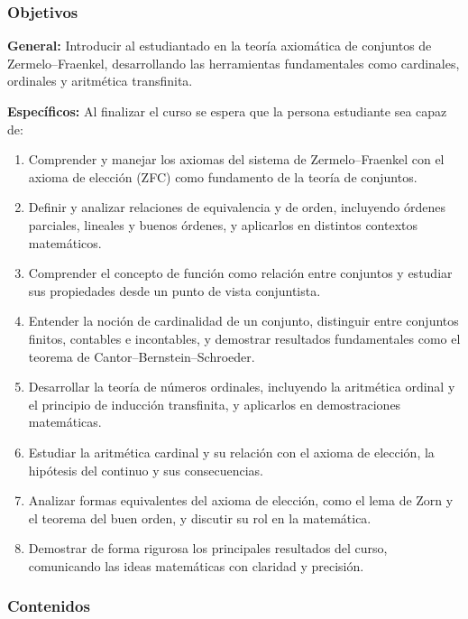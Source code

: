 \begin{refsection}
\subsubsection*{Objetivos}

\textbf{General:} Introducir al estudiantado en la teoría axiomática de conjuntos de Zermelo--Fraenkel, desarrollando las herramientas fundamentales como cardinales, ordinales y aritmética transfinita.

\textbf{Específicos:} Al finalizar el curso se espera que la persona estudiante sea capaz de:

\begin{enumerate}
\item Comprender y manejar los axiomas del sistema de Zermelo--Fraenkel con el axioma de elección (ZFC) como fundamento de la teoría de conjuntos.
\item Definir y analizar relaciones de equivalencia y de orden, incluyendo órdenes parciales, lineales y buenos órdenes, y aplicarlos en distintos contextos matemáticos.
\item Comprender el concepto de función como relación entre conjuntos y estudiar sus propiedades desde un punto de vista conjuntista.
\item Entender la noción de cardinalidad de un conjunto, distinguir entre conjuntos finitos, contables e incontables, y demostrar resultados fundamentales como el teorema de Cantor--Bernstein--Schroeder.
\item Desarrollar la teoría de números ordinales, incluyendo la aritmética ordinal y el principio de inducción transfinita, y aplicarlos en demostraciones matemáticas.
\item Estudiar la aritmética cardinal y su relación con el axioma de elección, la hipótesis del continuo y sus consecuencias.
\item Analizar formas equivalentes del axioma de elección, como el lema de Zorn y el teorema del buen orden, y discutir su rol en la matemática.
\item Demostrar de forma rigurosa los principales resultados del curso, comunicando las ideas matemáticas con claridad y precisión.
\end{enumerate}

\subsubsection*{Contenidos}

\begin{enumerate}


\end{enumerate}
\end{refsection}
